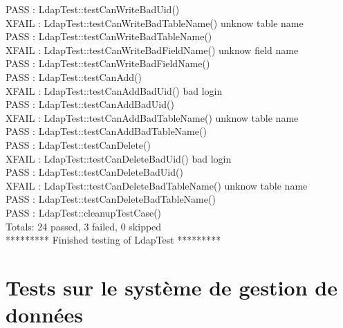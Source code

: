 \documentclass[11pt,fleqn]{report}
\begin{document}
PASS   : LdapTest::testCanWriteBadUid()\\
XFAIL  : LdapTest::testCanWriteBadTableName() unknow table name\\
PASS   : LdapTest::testCanWriteBadTableName()\\
XFAIL  : LdapTest::testCanWriteBadFieldName() unknow field name\\
PASS   : LdapTest::testCanWriteBadFieldName()\\
PASS   : LdapTest::testCanAdd()\\
XFAIL  : LdapTest::testCanAddBadUid() bad login\\
PASS   : LdapTest::testCanAddBadUid()\\
XFAIL  : LdapTest::testCanAddBadTableName() unknow table name\\
PASS   : LdapTest::testCanAddBadTableName()\\
PASS   : LdapTest::testCanDelete()\\
XFAIL  : LdapTest::testCanDeleteBadUid() bad login\\
PASS   : LdapTest::testCanDeleteBadUid()\\
XFAIL  : LdapTest::testCanDeleteBadTableName() unknow table name\\
PASS   : LdapTest::testCanDeleteBadTableName()\\
PASS   : LdapTest::cleanupTestCase()\\
Totals: 24 passed, 3 failed, 0 skipped\\
********* Finished testing of LdapTest *********\\

\chapter{Tests sur le système de gestion de données}
\end{document}
